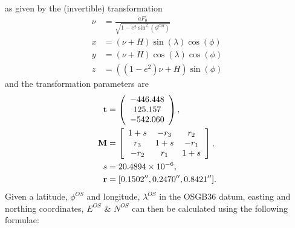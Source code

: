 \documentclass[letterpaper,10pt,english]{sphinxmanual}
\begin{document}
as given by the (invertible) transformation
\begin{equation*}
\begin{split}\nu &= \frac{aF_0}{\sqrt{1-e^2\sin^2(\phi^{OS})}} \\
x &= (\nu+H) \sin(\lambda)\cos(\phi) \\
y &= (\nu+H) \cos(\lambda)\cos(\phi) \\
z &= ((1-e^2)\nu+H)\sin(\phi)\end{split}
\end{equation*}
and the transformation parameters are
\begin{eqnarray*}
\mathbf{t} &= \left(\begin{array}{c}
-446.448\\ 125.157\\ -542.060
\end{array}\right),\\
\mathbf{M} &= \left[\begin{array}{ c c c }
1+s& -r_3& r_2\\
r_3 & 1+s & -r_1 \\
-r_2 & r_1 & 1+s
\end{array}\right], \\
s &= 20.4894\times 10^{-6}, \\
\mathbf{r} &= [0.1502'', 0.2470'', 0.8421''].
\end{eqnarray*}
Given a latitude, \(\phi^{OS}\) and longitude, \(\lambda^{OS}\) in the
OSGB36 datum, easting and northing coordinates, \(E^{OS}\) \& \(N^{OS}\)
can then be calculated using the following formulae:
\end{document}
